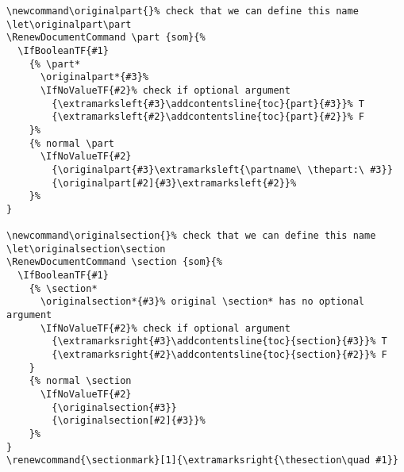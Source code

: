 \documentclass{article}
\newcommand\originalpart{}%
\let\originalpart\part
\newcommand\originalsection{}%
\let\originalsection\section
\renewcommand{\sectionmark}[1]{\extramarksright{\thesection\quad #1}}
\begin{document}
\noindent
\begin{boxedminipage}{\textwidth}
{\small\begin{verbatim}
\newcommand\originalpart{}% check that we can define this name
\let\originalpart\part
\RenewDocumentCommand \part {som}{%
  \IfBooleanTF{#1}
    {% \part*
      \originalpart*{#3}%
      \IfNoValueTF{#2}% check if optional argument
        {\extramarksleft{#3}\addcontentsline{toc}{part}{#3}}% T
        {\extramarksleft{#2}\addcontentsline{toc}{part}{#2}}% F
    }%
    {% normal \part
      \IfNoValueTF{#2}
        {\originalpart{#3}\extramarksleft{\partname\ \thepart:\ #3}}
        {\originalpart[#2]{#3}\extramarksleft{#2}}%
    }%
}

\newcommand\originalsection{}% check that we can define this name
\let\originalsection\section
\RenewDocumentCommand \section {som}{%
  \IfBooleanTF{#1}
    {% \section*
      \originalsection*{#3}% original \section* has no optional argument
      \IfNoValueTF{#2}% check if optional argument
        {\extramarksright{#3}\addcontentsline{toc}{section}{#3}}% T
        {\extramarksright{#2}\addcontentsline{toc}{section}{#2}}% F
    }
    {% normal \section
      \IfNoValueTF{#2}
        {\originalsection{#3}}
        {\originalsection[#2]{#3}}%
    }%
}
\renewcommand{\sectionmark}[1]{\extramarksright{\thesection\quad #1}}
\end{verbatim}}
\end{boxedminipage}
\end{document}
